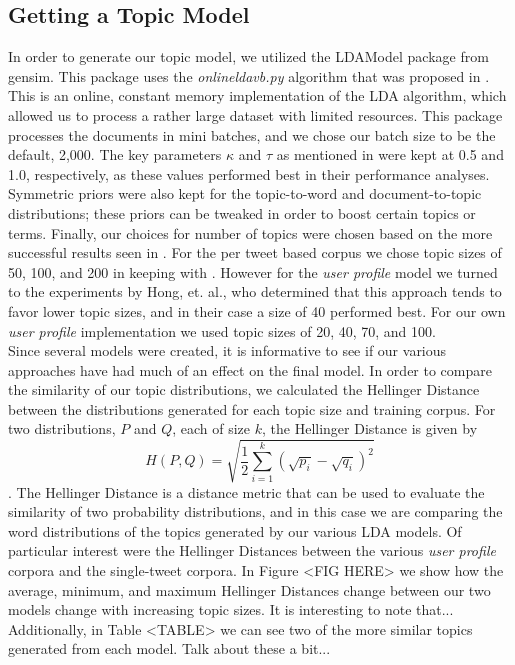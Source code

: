 \documentclass{acm_proc_article-sp}
\begin{document}
\subsection{Getting a Topic Model}
\hspace*{5mm}In order to generate our topic model, we utilized the LDAModel package from gensim. This package uses the \textit{onlineldavb.py} algorithm that was proposed in \cite{hoffman2010online}. This is an online, constant memory implementation of the LDA algorithm, which allowed us to process a rather large dataset with limited resources. This package processes the documents in mini batches, and we chose our batch size to be the default, 2,000. The key parameters $\kappa$ and $\tau$ as mentioned in \cite{hoffman2010online} were kept at 0.5 and 1.0, respectively, as these values performed best in their performance analyses. Symmetric priors were also kept for the topic-to-word and document-to-topic distributions; these priors can be tweaked in order to boost certain topics or terms. Finally, our choices for number of topics were chosen based on the more successful results seen in \cite{hong2010empirical}. For the per tweet based corpus we chose topic sizes of 50, 100, and 200 in keeping with \cite{godin2013using}. However for the \textit{user profile} model we turned to the experiments by Hong, et. al., who determined that this approach tends to favor lower topic sizes, and in their case a size of 40 performed best. For our own \textit{user profile} implementation we used topic sizes of 20, 40, 70, and 100.\\ 
\hspace*{5mm}Since several models were created, it is informative to see if our various approaches have had much of an effect on the final model. In order to compare the similarity of our topic distributions, we calculated the Hellinger Distance between the distributions generated for each topic size and training corpus. For two distributions, $P$ and $Q$, each of size $k$, the Hellinger Distance is given by\[H(P,Q) = \sqrt{\frac{1}{2}\sum_{i=1}^{k}(\sqrt{p_{i}}-\sqrt{q_{i}})^2}\]. The Hellinger Distance is a distance metric that can be used to evaluate the similarity of two probability distributions, and in this case we are comparing the word distributions of the topics generated by our various LDA models. Of particular interest were the Hellinger Distances between the various \textit{user profile} corpora and the single-tweet corpora. In Figure <FIG HERE> we show how the average, minimum, and maximum Hellinger Distances change between our two models change with increasing topic sizes. It is interesting to note that... Additionally, in Table <TABLE> we can see two of the more similar topics generated from each model. Talk about these a bit...
\end{document}
